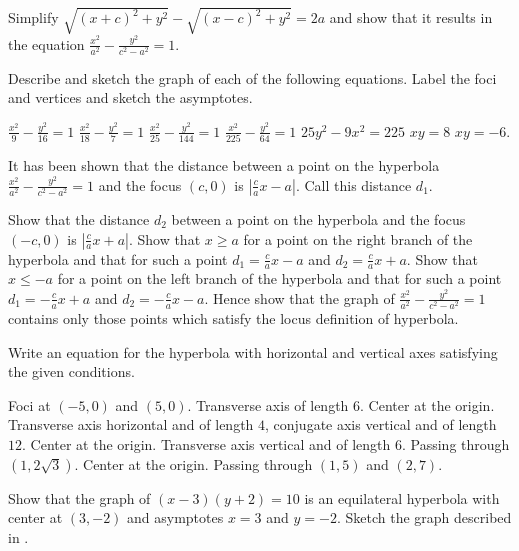 \begin{exercises}

Simplify $\sqrt{(x+c)^2 + y^2} - \sqrt{(x-c)^2 + y^2} = 2a$
and show that it results in the equation
$\frac{x^2}{a^2} - \frac{y^2}{c^2-a^2} = 1$.

Describe and sketch the graph of each of the following equations.
Label the foci and vertices and sketch the asymptotes.
\begin{exenum}
\sx
$\frac{x^2}{9} - \frac{y^2}{16} = 1$
\sx
$\frac{x^2}{18} - \frac{y^2}{7} = 1$
\sx
$\frac{x^2}{25} - \frac{y^2}{144} = 1$
\sx
$\frac{x^2}{225} - \frac{y^2}{64} = 1$
\sx
$25y^2 - 9x^2 = 225$
\sx
$xy = 8$
\sx
$xy = -6$.
\end{exenum}

It has been shown that the distance between a point on
the hyperbola $\frac{x^2}{a^2} - \frac{y^2}{c^2-a^2} = 1$
and the focus $(c,0)$ is $\left| \frac ca x - a \right|$.
Call this distance $d_1$.
\begin{exenum}
\sx
Show that the distance $d_2$ between a point on the
hyperbola and the focus $(-c,0)$ is
$\left| \frac ca x + a \right|$.
\sx
Show that $x \geq a$ for a point on the right branch of
the hyperbola and that for such a point
$d_1 = \frac ca x - a$ and $d_2 = \frac ca x + a$.
\sx
Show that $x \leq -a$ for a point on the left branch of
the hyperbola and that for such a point
$d_1 = -\frac ca x + a$ and $d_2 = -\frac ca x - a$.
\sx
Hence show that the graph of
$\frac{x^2}{a^2} - \frac{y^2}{c^2-a^2} = 1$
contains only those points which satisfy the locus
definition of hyperbola.
\end{exenum}

Write an equation for the hyperbola with horizontal
and vertical axes satisfying the given conditions.
\begin{exenum}
\sx
Foci at $(-5,0)$ and $(5,0)$.
Transverse axis of length $6$.
\sx
Center at the origin.
Transverse axis horizontal and of length $4$,
conjugate axis vertical and of length $12$.
\sx
Center at the origin.
Transverse axis vertical and of length $6$.
Passing through $(1, 2\sqrt3)$.
\sx
Center at the origin.
Passing through $(1,5)$ and $(2,7)$.
\end{exenum}

\begin{exenum}
\sx
{}
Show that the graph of $(x-3)(y+2) = 10$ is an
equilateral hyperbola with center at
$(3,-2)$ and asymptotes $x=3$ and $y=-2$.
\sx
Sketch the graph described in .
\end{exenum}


\end{exercises}
